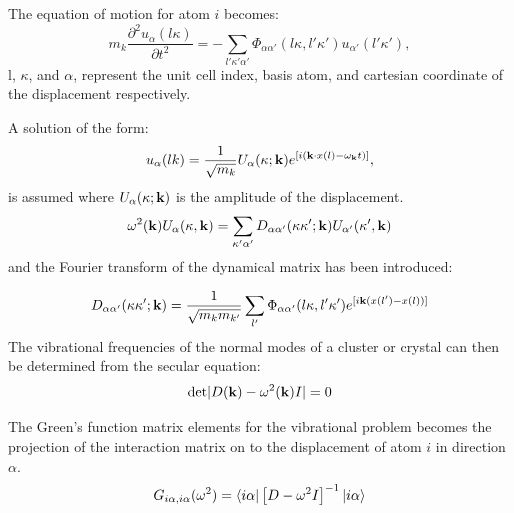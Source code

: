 The equation of motion for atom $i$ becomes:
%
\begin{equation}
m_{k} \frac{\partial^{2} u_\alpha (l\kappa)}{\partial t^{2}} = - \sum_{l'\kappa'\alpha'}
\Phi_{\alpha\alpha'}(l\kappa,l'\kappa')u_{\alpha'}(l'\kappa'),
\end{equation}
%
l, $\kappa$, and $\alpha$, represent the unit cell index, basis atom, and 
cartesian coordinate of the displacement respectively.

A solution of the form:
%
\begin{equation}
u_{\alpha}(lk) = \frac{1}{\sqrt{m_{k}}} U_{\alpha}(\kappa;{\bf k})e^{[i({\bf k}\cdot x(l) - \omega_{{\bf k}}t)]},
\end{equation}
%
is assumed where $U_{\alpha}(\kappa;{\bf k})$ is the amplitude of the displacement.
%
\begin{equation}
\omega^{2}({\bf k}) U_{\alpha}(\kappa, {\bf k}) = \sum_{\kappa'\alpha'}D_{\alpha\alpha'}(\kappa\kappa';{\bf k}) U_{\alpha'}(\kappa',{\bf k})
\end{equation}
%
and the Fourier transform of the dynamical matrix has been introduced:

\begin{equation}
D_{\alpha\alpha'}(\kappa\kappa';{\bf k}) = \frac{1}{\sqrt{m_{k}m_{k'}}} \sum_{l'} \Phi_{\alpha\alpha'}(l\kappa,l'\kappa') e^{[i{\bf k}(x(l')-x(l))]}
\end{equation}
%
The vibrational frequencies of the normal modes of a cluster or crystal can then be determined 
from the secular equation:
%
\begin{equation}
{\rm det}|D({\bf k}) - \omega^{2}({\bf k})I| = 0
\end{equation}
%

The Green's function matrix elements for the vibrational problem 
becomes the projection of the interaction matrix on to the 
displacement of atom $i$ in direction $\alpha$.
%
\begin{equation}
G_{i\alpha,i\alpha}(\omega^{2})= \langle i\alpha| \left[D- \omega^{2}I\right]^{-1} |i\alpha \rangle
\end{equation}
%

